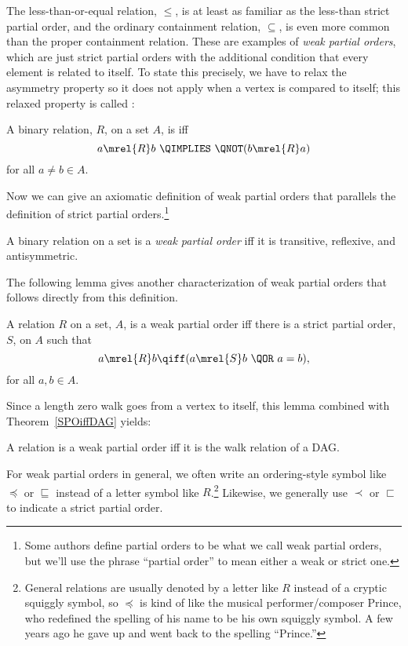 The less-than-or-equal relation, $\leq$, is at least as familiar as
the less-than strict partial order, and the ordinary containment
relation, $\subseteq$, is even more common than the proper containment
relation.  These are examples of \emph{weak partial orders}, which are
just strict partial orders with the additional condition that every
element is related to itself.  To state this precisely, we have to
relax the asymmetry property so it does not apply when a vertex is
compared to itself; this relaxed property is called
:

\begin{definition}\label{antis}
A binary relation, $R$, on a set $A$, is  iff
\[
a \mrel{R}  b\ \QIMPLIES\ \QNOT(b \mrel{R}  a)
\]
for all $a \neq b \in A$.
\end{definition}

Now we can give an axiomatic definition of weak partial orders that
parallels the definition of strict partial orders.\footnote{Some
  authors define partial orders to be what we call weak partial
  orders, but we'll use the phrase ``partial order'' to mean either a
  weak or strict one.}

\begin{definition}\label{def:weakPO-axiom}
A binary relation on a set is a \emph{weak partial order} iff it is
transitive, reflexive, and antisymmetric.
\end{definition}

The following lemma gives another characterization of weak partial
orders that follows directly from this definition.
\begin{lemma}
A relation $R$ on a set, $A$, is a weak partial order iff
there is a strict partial order, $S$, on $A$ such that
\[
a \mrel{R} b \qiff (a \mrel{S} b\ \QOR\ a = b),
\]
for all $a,b \in A$.
\end{lemma}

Since a length zero walk goes from a vertex to itself, this lemma
combined with Theorem~\ref{SPOiffDAG} yields:
\begin{corollary}\label{weakPOiffDAGwalk}
A relation is a weak partial order iff it is the walk relation of a DAG.
\end{corollary}

For weak partial orders in general, we often write an ordering-style
symbol like $\preceq$ or $\sqsubseteq$ instead of a letter symbol like
$R$.\footnote{General relations are usually denoted by a letter like
  $R$ instead of a cryptic squiggly symbol, so $\preceq$ is kind of
  like the musical performer/composer Prince, who redefined the
  spelling of his name to be his own squiggly symbol.  A few years ago
  he gave up and went back to the spelling ``Prince.''}  Likewise, we
generally use $\prec$ or $\sqsubset$ to indicate a strict partial
order.

